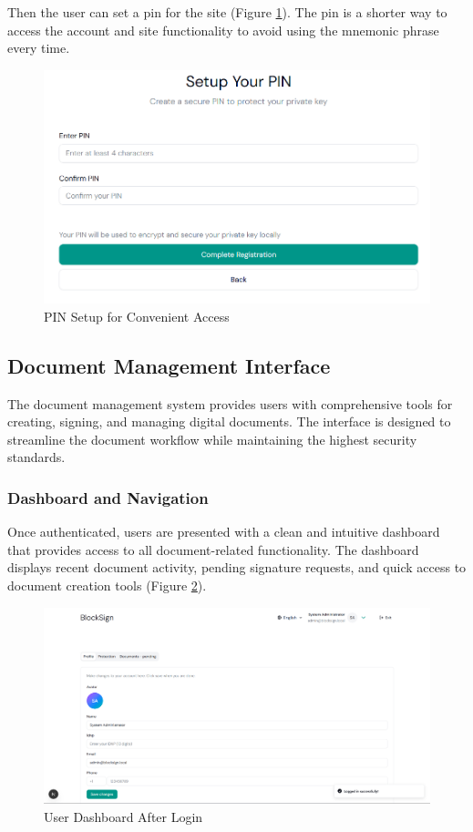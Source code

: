 Then the user can set a pin for the site (Figure \ref{pin-for-site}). The pin is a shorter way to access the account and site functionality to avoid using the mnemonic phrase every time. 

\begin{figure}[H]
    \centering
    \includegraphics[width=18cm]{"images/siteUI/pinForSite.png"}
    \caption{PIN Setup for Convenient Access}
    \label{pin-for-site}
\end{figure}

\subsection{Document Management Interface}
The document management system provides users with comprehensive tools for creating, signing, and managing digital documents. The interface is designed to streamline the document workflow while maintaining the highest security standards.

\subsubsection{Dashboard and Navigation}
Once authenticated, users are presented with a clean and intuitive dashboard that provides access to all document-related functionality. The dashboard displays recent document activity, pending signature requests, and quick access to document creation tools (Figure \ref{logged-in-dashboard}).

\begin{figure}[H]
    \centering
    \includegraphics[width=18cm]{"images/siteUI/logedIn.png"}
    \caption{User Dashboard After Login}
    \label{logged-in-dashboard}
\end{figure}


